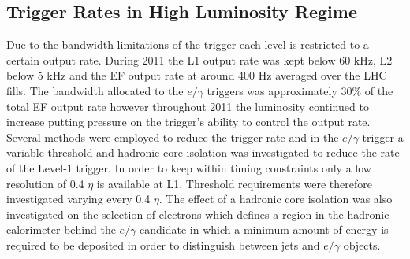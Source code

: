	\subsection{Trigger Rates in High Luminosity Regime}
		\label{sec:TrigRates}

		Due to the bandwidth limitations of the trigger each level is restricted to a certain output rate. During 2011 the L1 output rate was kept below 60 kHz, L2 below 5 kHz and the EF output rate at around 400 Hz averaged over the LHC fills. The bandwidth allocated to the $e/\gamma$ triggers was approximately 30\% of the total EF output rate however throughout 2011 the luminosity continued to increase putting pressure on the trigger's ability to control the output rate. Several methods were employed to reduce the trigger rate and in the $e/\gamma$ trigger a variable threshold and hadronic core isolation was investigated to reduce the rate of the Level-1 trigger. In order to keep within timing constraints only a low resolution of 0.4 $\eta$ is available at L1. Threshold requirements were therefore investigated varying every 0.4 $\eta$. The effect of a hadronic core isolation was also investigated on the selection of electrons which defines a region in the hadronic calorimeter behind the $e/\gamma$ candidate in which a minimum amount of energy is required to be deposited in order to distinguish between jets and $e/\gamma$ objects. 


